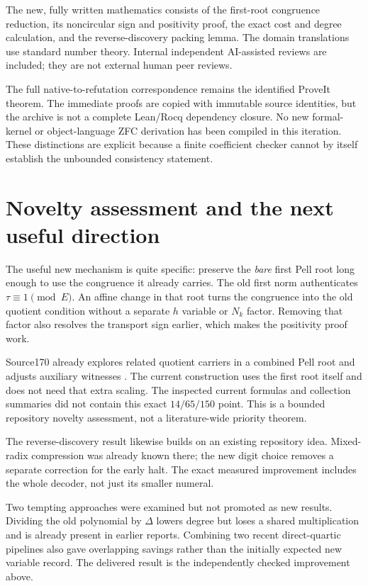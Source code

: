 \documentclass[11pt,letterpaper]{article}
\theoremstyle{definition}
\begin{document}
The new, fully written mathematics consists of the first-root congruence
reduction, its noncircular sign and positivity proof, the exact cost and
degree calculation, and the reverse-discovery packing lemma. The domain
translations use standard number theory. Internal independent AI-assisted
reviews are included; they are not external human peer reviews.

The full native-to-refutation correspondence remains the identified
ProveIt theorem. The immediate proofs are copied with immutable source
identities, but the archive is not a complete Lean/Rocq dependency closure.
No new formal-kernel or object-language ZFC derivation has been compiled
in this iteration. These distinctions are explicit because a finite
coefficient checker cannot by itself establish the unbounded consistency
statement.

\section{Novelty assessment and the next useful direction}

The useful new mechanism is quite specific: preserve the \emph{bare}
first Pell root long enough to use the congruence it already carries.
The old first norm authenticates \(\tau\equiv1\pmod E\). An affine
change in that root turns the congruence into the old quotient condition
without a separate \(h\) variable or \(N_k\) factor. Removing that factor
also resolves the transport sign earlier, which makes the positivity
proof work.

Source170 already explores related quotient carriers in a combined Pell
root and adjusts auxiliary witnesses \cite{quotient}. The current
construction uses the first root itself and does not need that extra
scaling. The inspected current formulas and collection summaries did
not contain this exact \(14/65/150\) point. This is a bounded repository
novelty assessment, not a literature-wide priority theorem.

The reverse-discovery result likewise builds on an existing repository
idea. Mixed-radix compression was already known there; the new digit
choice removes a separate correction for the early halt. The exact
measured improvement includes the whole decoder, not just its smaller
numeral.

Two tempting approaches were examined but not promoted as new results.
Dividing the old polynomial by \(\Delta\) lowers degree but loses a
shared multiplication and is already present in earlier reports.
Combining two recent direct-quartic pipelines also gave overlapping
savings rather than the initially expected new variable record.
The delivered result is the independently checked improvement above.
\end{document}
